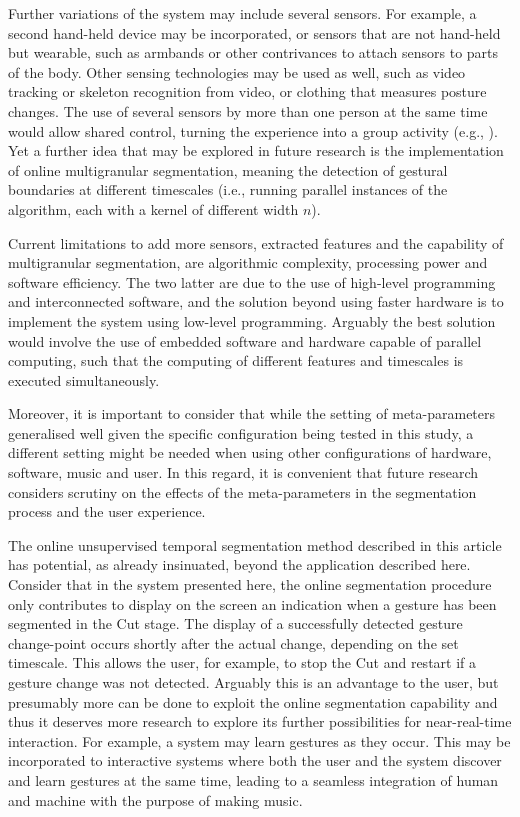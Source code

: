 \documentclass{nime-alternate_MANUSCRIPT} %
\begin{document}
Further variations of the system may include several sensors. For example, a second hand-held device may be incorporated, or sensors that are not hand-held but wearable, such as armbands or other contrivances to attach sensors to parts of the body. Other sensing technologies may be used as well, such as video tracking or skeleton recognition from video, or clothing that measures posture changes. The use of several sensors by more than one person at the same time would allow shared control, turning the experience into a group activity (e.g., \cite{Staudt_etal_2022, Tahiroglu_etal_2013}). Yet a further idea that may be explored in future research is the implementation of online multigranular segmentation, meaning the detection of gestural boundaries at different timescales (i.e., running parallel instances of the algorithm, each with a kernel of different width $n$). 

Current limitations to add more sensors, extracted features and the capability of multigranular segmentation, are algorithmic complexity, processing power and software efficiency. The two latter are due to the use of high-level programming and interconnected software, and the solution beyond using faster hardware is to implement the system using low-level programming. Arguably the best solution would involve the use of embedded software and hardware capable of parallel computing, such that the computing of different features and timescales is executed simultaneously. 

Moreover, it is important to consider that while the setting of meta-parameters generalised well given the specific configuration being tested in this study, a different setting might be needed when using other configurations of hardware, software, music and user. In this regard, it is convenient that future research considers scrutiny on the effects of the meta-parameters in the segmentation process and the user experience.

The online unsupervised temporal segmentation method described in this article has potential, as already insinuated, beyond the application described here. Consider that in the system presented here, the online segmentation procedure only contributes to display on the screen an indication when a gesture has been segmented in the Cut stage.  The display of a successfully detected gesture change-point occurs shortly after the actual change, depending on the set timescale. This allows the user, for example, to stop the Cut and restart if a gesture change was not detected. Arguably this is an advantage to the user, but presumably more can be done to exploit the online segmentation capability and thus it deserves more research to explore its further possibilities for near-real-time interaction. For example, a system may learn gestures as they occur. This may be incorporated to interactive systems where both the user and the system discover and learn gestures at the same time, leading to a seamless integration of human and machine with the purpose of making music.
\end{document}
